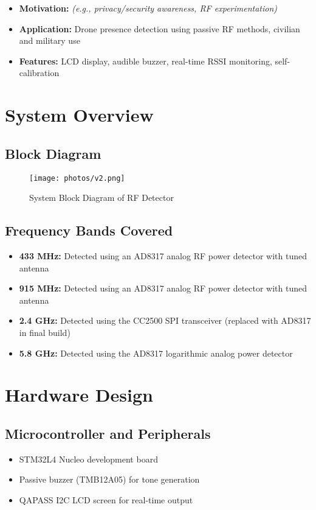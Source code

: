 \documentclass[12pt]{article}
\begin{document}
\begin{itemize}
    \item \textbf{Motivation:} \textit{(e.g., privacy/security awareness, RF experimentation)}
    \item \textbf{Application:} Drone presence detection using passive RF methods, civilian and military use
    \item \textbf{Features:} LCD display, audible buzzer, real-time RSSI monitoring, self-calibration
\end{itemize}

\section{System Overview}

\subsection{Block Diagram}
\begin{figure}[H]
    \centering
    \texttt{[image: photos/v2.png]}
    \caption{System Block Diagram of RF Detector}
\end{figure}


\subsection{Frequency Bands Covered}
\begin{itemize}
    \item \textbf{433 MHz:} Detected using an AD8317 analog RF power detector with tuned antenna
    \item \textbf{915 MHz:} Detected using an AD8317 analog RF power detector with tuned antenna
    \item \textbf{2.4 GHz:} Detected using the CC2500 SPI transceiver (replaced with AD8317 in final build)
    \item \textbf{5.8 GHz:} Detected using the AD8317 logarithmic analog power detector
\end{itemize}

\section{Hardware Design}

\subsection{Microcontroller and Peripherals}
\begin{itemize}
    \item STM32L4 Nucleo development board
    \item Passive buzzer (TMB12A05) for tone generation
    \item QAPASS I2C LCD screen for real-time output
\end{itemize}
\end{document}

